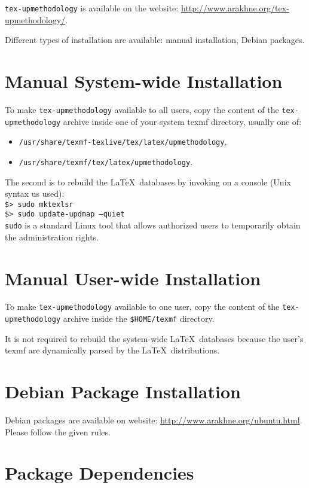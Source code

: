 \documentclass[book,taskpackage,specpackage,codepackage]{upmethodology-document}
\begin{document}
\texttt{tex-upmethodology} is available on the \arakhneorg website: \url{http://www.arakhne.org/tex-upmethodology/}.

Different types of installation are available: manual installation, Debian packages.

\section{Manual System-wide Installation}

To make \texttt{tex-upmethodology} available to all users, copy the content of the \texttt{tex-upmethodology} archive inside one of your system texmf directory, usually one of:
\begin{itemize}
\item \texttt{/usr/share/texmf-texlive/tex/latex/upmethodology},
\item \texttt{/usr/share/texmf/tex/latex/upmethodology}.
\end{itemize}

The second is to rebuild the \LaTeX\ databases by invoking on a console (Unix syntax us used): \\
\texttt{\$> sudo mktexlsr}\\
\texttt{\$> sudo update-updmap --quiet}\\

\texttt{sudo} is a standard Linux tool that allows authorized users to temporarily obtain the administration rights.

\section{Manual User-wide Installation}

To make \texttt{tex-upmethodology} available to one user, copy the content of the \texttt{tex-upmethodology} archive inside the \texttt{\$HOME/texmf} directory.

It is not required to rebuild the system-wide \LaTeX\ databases because the user's texmf are dynamically parsed by the \LaTeX\ distributions.

\section{Debian Package Installation}

Debian packages are available on \arakhneorg website: \url{http://www.arakhne.org/ubuntu.html}. Please follow the given rules.

\section{Package Dependencies}
\end{document}
